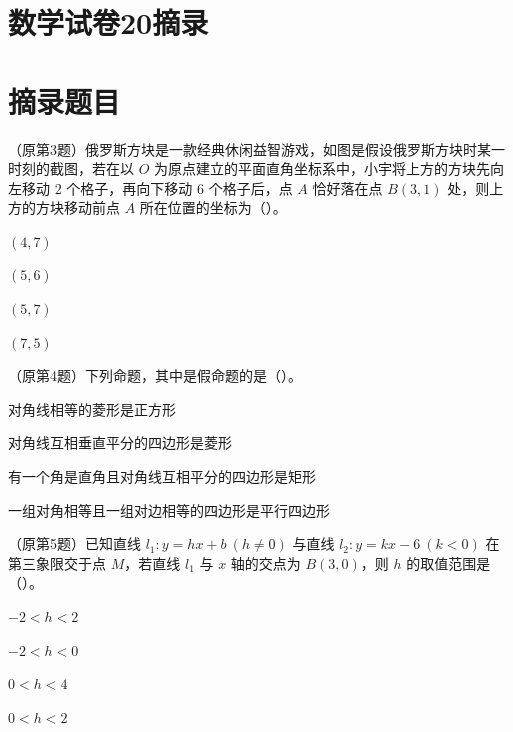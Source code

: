 \documentclass{exam-zh}
\begin{document}
\section*{数学试卷20摘录}

\section*{摘录题目}


\begin{question}[points=4]
  （原第3题）俄罗斯方块是一款经典休闲益智游戏，如图是假设俄罗斯方块时某一时刻的截图，若在以 $O$ 为原点建立的平面直角坐标系中，小宇将上方的方块先向左移动 $2$ 个格子，再向下移动 $6$ 个格子后，点 $A$ 恰好落在点 $B(3,1)$ 处，则上方的方块移动前点 $A$ 所在位置的坐标为（\quad）。
  \begin{choices}
    \item $(4,7)$
    \item $(5,6)$
    \item $(5,7)$
    \item $(7,5)$
  \end{choices}
\end{question}



\begin{question}[points=4]
  （原第4题）下列命题，其中是假命题的是（\quad）。
  \begin{choices}
    \item 对角线相等的菱形是正方形
    \item 对角线互相垂直平分的四边形是菱形
    \item 有一个角是直角且对角线互相平分的四边形是矩形
    \item 一组对角相等且一组对边相等的四边形是平行四边形
  \end{choices}
\end{question}



\begin{question}[points=4]
  （原第5题）已知直线 $l_1:y=hx+b\ (h\ne0)$ 与直线 $l_2:y=kx-6\ (k<0)$ 在第三象限交于点 $M$，若直线 $l_1$ 与 $x$ 轴的交点为 $B(3,0)$，则 $h$ 的取值范围是（\quad）。
  \begin{choices}
    \item $-2<h<2$
    \item $-2<h<0$
    \item $0<h<4$
    \item $0<h<2$
  \end{choices}
\end{question}
\end{document}
